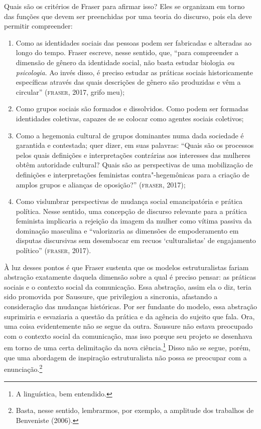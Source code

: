 Quais são os critérios de Fraser para afirmar isso? Eles se organizam em
torno das funções que devem ser preenchidas por uma teoria do discurso,
pois ela deve permitir compreender:

\begin{enumerate}
\def\labelenumi{\arabic{enumi})}
\item
Como as identidades sociais das pessoas podem ser fabricadas e
alteradas ao longo do tempo. Fraser escreve, nesse sentido, que,
``para compreender a dimensão de gênero da identidade social, não
basta estudar biologia \emph{ou psicologia}. Ao invés disso, é preciso
estudar as práticas sociais historicamente específicas através das quais
descrições de gênero são produzidas e vêm a circular'' (\textsc{fraser}, 2017,
grifo meu);
\item
Como grupos sociais são formados e dissolvidos. Como podem ser
formadas identidades coletivas, capazes de se colocar como agentes
sociais coletivos;
\item
Como a hegemonia cultural de grupos dominantes numa dada sociedade é
garantida e contestada; quer dizer, em suas palavras: ``Quais são
os processos pelos quais definições e interpretações contrárias aos
interesses das mulheres obtêm autoridade cultural? Quais são as
perspectivas de uma mobilização de definições e interpretações
feministas contra"-hegemônicas para a criação de amplos grupos e alianças
de oposição?'' (\textsc{fraser}, 2017);
\item
Como vislumbrar perspectivas de mudança social emancipatória e
prática política. Nesse sentido, uma concepção de discurso relevante
para a prática feminista implicaria a rejeição da imagem da mulher como
vítima passiva da dominação masculina e ``valorizaria as dimensões
de empoderamento em disputas discursivas sem desembocar em recuos
`culturalistas' de engajamento político'' (\textsc{fraser}, 2017).
\end{enumerate}

À luz desses pontos é que Fraser sustenta que os modelos estruturalistas
fariam abstração exatamente daquela dimensão sobre a qual é preciso
pensar: as práticas sociais e o contexto social da comunicação. Essa
abstração, assim ela o diz, teria sido promovida por Saussure, que
privilegiou a sincronia, afastando a consideração das mudanças
históricas. Por ser fundante do modelo, essa abstração suprimiria e
esvaziaria a questão da prática e da agência do sujeito que fala. Ora,
uma coisa evidentemente não se segue da outra. Saussure não estava
preocupado com o contexto social da comunicação, mas isso porque seu
projeto se desenhava em torno de uma certa delimitação da nova
ciência.\footnote{A linguística, bem entendido.} Disso não se segue,
porém, que uma abordagem de inspiração estruturalista não possa se
preocupar com a enunciação.\footnote{Basta, nesse sentido, lembrarmos,
  por exemplo, a amplitude dos trabalhos de Benveniste (2006).}

